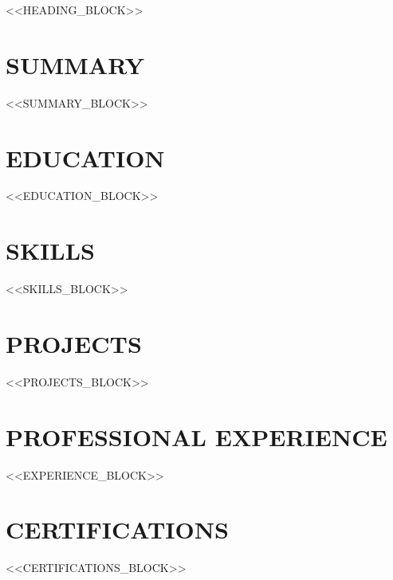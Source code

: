 \documentclass[letterpaper,10pt]{article}
\newcommand{\resumeSubHeadingListStart}{\begin{itemize}[leftmargin=0in, label={}]}
\newcommand{\resumeSubHeadingListEnd}{\end{itemize}}
\begin{document}
<<HEADING_BLOCK>>

\section{SUMMARY}
\begin{itemize}[leftmargin=0in, label={}, itemsep=0pt]
    \small{\item{<<SUMMARY_BLOCK>>}}
\end{itemize}

\section{EDUCATION}
  \resumeSubHeadingListStart
<<EDUCATION_BLOCK>>
  \resumeSubHeadingListEnd

\section{SKILLS}
 \begin{itemize}[leftmargin=0in, label={}, itemsep=-2pt]
    \small{\item{<<SKILLS_BLOCK>>}}
 \end{itemize}

\section{PROJECTS}
    \resumeSubHeadingListStart
<<PROJECTS_BLOCK>>
    \resumeSubHeadingListEnd

\section{PROFESSIONAL EXPERIENCE}
  \resumeSubHeadingListStart
<<EXPERIENCE_BLOCK>>
  \resumeSubHeadingListEnd

\section{CERTIFICATIONS}
\begin{itemize}[leftmargin=0in, label={}, itemsep=-2pt]
    \small{\item{<<CERTIFICATIONS_BLOCK>>}}
\end{itemize}
\end{document}
